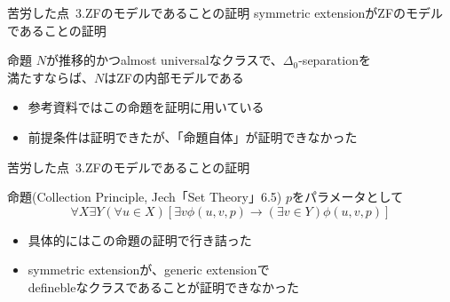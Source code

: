 \documentclass[17pt,aspectratio=169]{beamer}
\begin{document}
\begin{frame}{苦労した点\, {\normalsize 3.ZFのモデルであることの証明}}
    symmetric extensionがZFのモデルであることの証明
    \begin{itembox}[l]{命題}
        {\small
            $N$が推移的かつalmost universalなクラスで、$\Delta_0$-separationを\\
            満たすならば、$N$はZFの内部モデルである
        }
    \end{itembox}
    {\small
    \begin{itemize}[itemsep=8pt]
        \item 参考資料ではこの命題を証明に用いている
        \item 前提条件は証明できたが、「命題自体」が証明できなかった
    \end{itemize}
    }
\end{frame}

\begin{frame}{苦労した点\, {\normalsize 3.ZFのモデルであることの証明}}

    \begin{itembox}[l]{命題(Collection Principle, Jech「Set Theory」6.5)}
        {\small $p$をパラメータとして}
        \vspace{-10pt}
        $$\forall X \exists Y (\forall u \in X)[\exists v \phi(u, v, p) \rightarrow (\exists v \in Y) \phi(u, v, p)]$$
    \end{itembox}

    \vspace{-5pt}
    {\small
        \begin{itemize}[itemsep=5pt]
            \item 具体的にはこの命題の証明で行き詰った
            \item symmetric extensionが、generic extensionで\\
                  definebleなクラスであることが証明できなかった
        \end{itemize}
    }

\end{frame}
\end{document}
